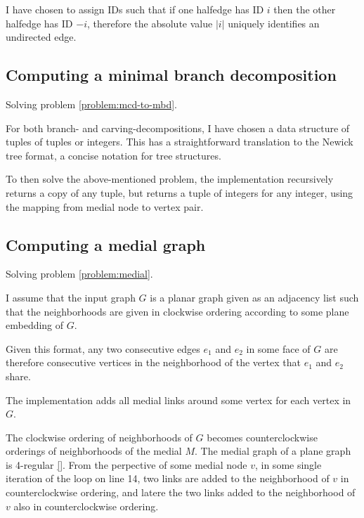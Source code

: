 \documentclass{article}
\begin{document}
	I have chosen to assign IDs such that if one halfedge has ID $i$ then the other halfedge has ID $-i$, therefore the absolute value $|i|$ uniquely identifies an undirected edge.


	\subsection{Computing a minimal branch decomposition}\label{impl:mcd-to-mbd}
		
		Solving problem \ref{problem:mcd-to-mbd}.

		For both branch- and carving-decompositions, I have chosen a data structure of tuples of tuples or integers. This has a straightforward translation to the Newick tree format, a concise notation for tree structures.

		To then solve the above-mentioned problem, the implementation recursively returns a copy of any tuple, but returns a tuple of integers for any integer, using the mapping from medial node to vertex pair.

		
	\subsection{Computing a medial graph}\label{impl:medial}
		
		Solving problem \ref{problem:medial}.

		I assume that the input graph $G$ is a planar graph given as an adjacency list such that the neighborhoods are given in clockwise ordering according to some plane embedding of $G$.
		
		Given this format, any two consecutive edges $e_1$ and $e_2$ in some face of $G$ are therefore consecutive vertices in the neighborhood of the vertex that $e_1$ and $e_2$ share.

		The implementation adds all medial links around some vertex for each vertex in $G$. 
		
		The clockwise ordering of neighborhoods of $G$ becomes counterclockwise orderings of neighborhoods of the medial $M$. The medial graph of a plane graph is 4-regular \ref{}. From the perpective of some medial node $v$, in some single iteration of the loop on line 14, two links are added to the neighborhood of $v$ in counterclockwise ordering, and latere the two links added to the neighborhood of $v$ also in counterclockwise ordering.
\end{document}
